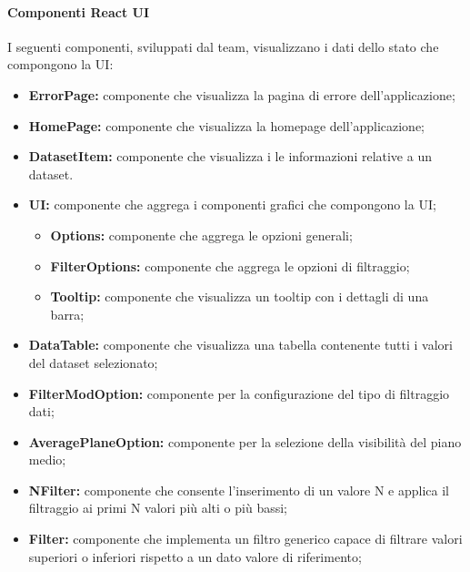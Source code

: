 \paragraph{Componenti React UI}
I seguenti componenti, sviluppati dal team, visualizzano i dati dello stato che
compongono la UI:
\begin{itemize}
      \item \textbf{ErrorPage:} componente che visualizza la pagina di errore dell'applicazione;
      \item \textbf{HomePage:} componente che visualizza la homepage dell'applicazione;
      \item \textbf{DatasetItem:} componente che visualizza i le informazioni relative a un dataset.
      \item \textbf{UI:} componente che aggrega i componenti grafici che compongono la UI;
            \begin{itemize}
                  \item \textbf{Options:} componente che aggrega le opzioni generali;
                  \item \textbf{FilterOptions:} componente che aggrega le opzioni di filtraggio;
                  \item \textbf{Tooltip:} componente che visualizza un tooltip con i dettagli di una barra;
            \end{itemize}
      \item \textbf{DataTable:} componente che visualizza una tabella contenente tutti i valori del dataset selezionato;
      \item \textbf{FilterModOption:} componente per la configurazione del tipo di filtraggio dati;
      \item \textbf{AveragePlaneOption:} componente per la selezione della visibilità del piano medio;
      \item \textbf{NFilter:} componente che consente l'inserimento di un valore N e applica il filtraggio ai primi N valori più alti o più bassi;
      \item \textbf{Filter:} componente che implementa un filtro generico capace di filtrare valori superiori o inferiori rispetto a un dato valore di riferimento;
\end{itemize}
